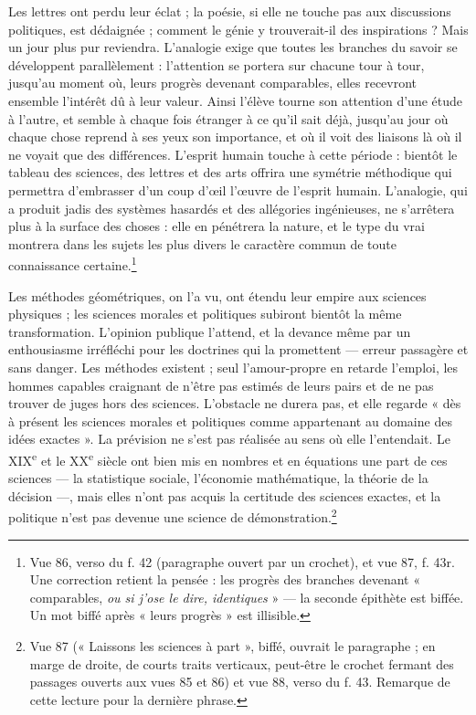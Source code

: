 \documentclass[11pt,a4paper]{article}
\begin{document}
Les lettres ont perdu leur éclat ; la poésie, si elle ne touche pas aux
discussions politiques, est dédaignée ; comment le génie y trouverait-il des
inspirations ? Mais un jour plus pur reviendra. L'analogie exige que toutes les
branches du savoir se développent parallèlement : l'attention se portera sur
chacune tour à tour, jusqu'au moment où, leurs progrès devenant comparables,
elles recevront ensemble l'intérêt dû à leur valeur. Ainsi l'élève tourne son
attention d'une étude à l'autre, et semble à chaque fois étranger à ce qu'il
sait déjà, jusqu'au jour où chaque chose reprend à ses yeux son importance, et où
il voit des liaisons là où il ne voyait que des différences. L'esprit humain
touche à cette période : bientôt le tableau des sciences, des lettres et des arts
offrira une symétrie méthodique qui permettra d'embrasser d'un coup d'œil
l'œuvre de l'esprit humain. L'analogie, qui a produit jadis des systèmes
hasardés et des allégories ingénieuses, ne s'arrêtera plus à la surface des
choses : elle en pénétrera la nature, et le type du vrai montrera dans les sujets
les plus divers le caractère commun de toute connaissance
certaine.\footnote{Vue 86, verso du f. 42 (paragraphe ouvert par un crochet), et
vue 87, f. 43r. Une correction retient la pensée : les progrès des branches
devenant « comparables, \emph{ou si j'ose le dire, identiques} » — la seconde
épithète est biffée. Un mot biffé après « leurs progrès » est illisible.}

Les méthodes géométriques, on l'a vu, ont étendu leur empire aux sciences
physiques ; les sciences morales et politiques subiront bientôt la même
transformation. L'opinion publique l'attend, et la devance même par un
enthousiasme irréfléchi pour les doctrines qui la promettent — erreur passagère
et sans danger. Les méthodes existent ; seul l'amour-propre en retarde l'emploi,
les hommes capables craignant de n'être pas estimés de leurs pairs et de ne pas
trouver de juges hors des sciences. L'obstacle ne durera pas, et elle regarde
« dès à présent les sciences morales et politiques comme appartenant au domaine
des idées exactes ». La prévision ne s'est pas réalisée au sens où elle
l'entendait. Le XIX\textsuperscript{e} et le XX\textsuperscript{e} siècle ont
bien mis en nombres et en équations une part de ces sciences — la statistique
sociale, l'économie mathématique, la théorie de la décision —, mais elles n'ont
pas acquis la certitude des sciences exactes, et la politique n'est pas devenue
une science de démonstration.\footnote{Vue 87 (« Laissons les sciences à part »,
biffé, ouvrait le paragraphe ; en marge de droite, de courts traits verticaux,
peut-être le crochet fermant des passages ouverts aux vues 85 et 86) et vue 88,
verso du f. 43. Remarque de cette lecture pour la dernière phrase.}
\end{document}
